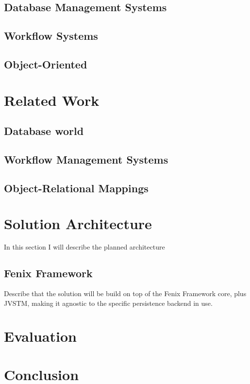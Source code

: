 \documentclass{llncs}
\begin{document}
\subsection{Database Management Systems}

\subsection{Workflow Systems}

\subsection{Object-Oriented}

\section{Related Work}

\subsection{Database world}

\subsection{Workflow Management Systems}

\subsection{Object-Relational Mappings}

\section{Solution Architecture}

In this section I will describe the planned architecture 

\subsection{Fenix Framework}

Describe that the solution will be build on top of the Fenix Framework
core, plus JVSTM, making it agnostic to the specific persistence
backend in use. 

\section{Evaluation}

\section{Conclusion}



\end{document}
